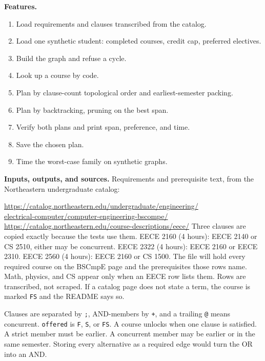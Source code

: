 \documentclass[10pt]{article}
\begin{document}
\textbf{Features.}
\begin{enumerate}
  \item Load requirements and clauses transcribed from the catalog.
  \item Load one synthetic student: completed courses, credit cap, preferred electives.
  \item Build the graph and refuse a cycle.
  \item Look up a course by code.
  \item Plan by clause-count topological order and earliest-semester packing.
  \item Plan by backtracking, pruning on the best span.
  \item Verify both plans and print span, preference, and time.
  \item Save the chosen plan.
  \item Time the worst-case family on synthetic graphs.
\end{enumerate}

\textbf{Inputs, outputs, and sources.}
Requirements and prerequisite text, from the Northeastern undergraduate catalog:

{\scriptsize
\href{https://catalog.northeastern.edu/undergraduate/engineering/electrical-computer/computer-engineering-bscompe/}{https://catalog.northeastern.edu/undergraduate/engineering/}\\
\href{https://catalog.northeastern.edu/undergraduate/engineering/electrical-computer/computer-engineering-bscompe/}{electrical-computer/computer-engineering-bscompe/}\\
\url{https://catalog.northeastern.edu/course-descriptions/eece/}}
Three clauses are copied exactly because the tests use them.
EECE 2160 (4 hours): EECE 2140 or CS 2510, either may be concurrent.
EECE 2322 (4 hours): EECE 2160 or EECE 2310.
EECE 2560 (4 hours): EECE 2160 or CS 1500. The file will hold every
required course on the BSCmpE page and the prerequisites those rows name.
Math, physics, and CS appear only when an EECE row lists them. Rows are
transcribed, not scraped. If a catalog page does not state a term, the course
is marked \texttt{FS} and the README says so.

Clauses are separated by \texttt{;}, AND-members by \texttt{+}, and a trailing
\texttt{@} means concurrent. \texttt{offered} is \texttt{F}, \texttt{S}, or
\texttt{FS}. A course unlocks when one clause is satisfied. A strict member
must be earlier. A concurrent member may be earlier or in the same semester.
Storing every alternative as a required edge would turn the OR into an AND.
\end{document}
